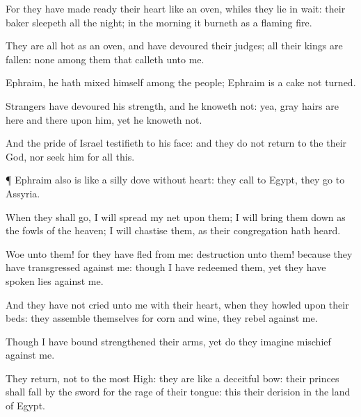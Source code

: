 {For they have made
ready their
heart like an
oven, whiles they lie in
wait: their
baker
sleepeth all the
night; in the
morning it
burneth as a
flaming
fire.

They are all
hot as an
oven, and have
devoured their
judges; all their
kings are
fallen:
{} none among them that
calleth unto me.


\par }{\PP {}Ephraim, he hath
mixed himself among the
people;
Ephraim is a
cake not
turned.

Strangers have
devoured his
strength, and he
knoweth
{} not: yea, gray
hairs are here and
there upon him, yet he
knoweth not.

And the
pride of
Israel
testifieth to his
face: and they do not
return to the
{} their
God, nor
seek him for all this.


\par }{\PP {}¶
Ephraim also is like a
silly
dove without
heart: they
call to
Egypt, they
go to
Assyria.

When they shall
go, I will
spread my
net upon them; I will bring them
down as the
fowls of the
heaven; I will
chastise them, as their
congregation hath
heard.

Woe unto them! for they have
fled from me:
destruction unto them! because they have
transgressed against me: though I have
redeemed them, yet they have
spoken
lies against me.

And they have not
cried unto me with their
heart, when they
howled upon their
beds: they
assemble themselves for
corn and
wine,
{} they
rebel against me.

Though I have
bound
{}
strengthened their
arms, yet do they
imagine
mischief against me.

They
return,
{} not to the most
High: they are like a
deceitful
bow: their
princes shall
fall by the
sword for the
rage of their
tongue:
this
{} their
derision in the
land of
Egypt.




\par }
